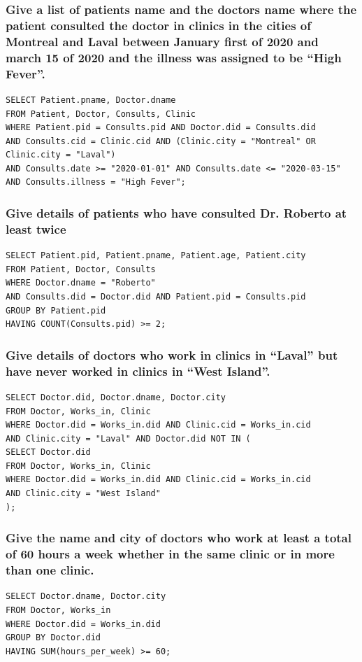 \documentclass[a4paper]{article}
\begin{document}
\subsubsection{Give a list of patients name and the doctors name where the patient consulted the doctor
in clinics in the cities of Montreal and Laval between January first of 2020 and march 15
of 2020 and the illness was assigned to be “High Fever”.}

\begin{verbatim}
SELECT Patient.pname, Doctor.dname
FROM Patient, Doctor, Consults, Clinic
WHERE Patient.pid = Consults.pid AND Doctor.did = Consults.did
AND Consults.cid = Clinic.cid AND (Clinic.city = "Montreal" OR Clinic.city = "Laval") 
AND Consults.date >= "2020-01-01" AND Consults.date <= "2020-03-15"
AND Consults.illness = "High Fever";
\end{verbatim}

\subsubsection{Give details of patients who have consulted Dr. Roberto at least twice}
\begin{verbatim}
SELECT Patient.pid, Patient.pname, Patient.age, Patient.city 
FROM Patient, Doctor, Consults
WHERE Doctor.dname = "Roberto"
AND Consults.did = Doctor.did AND Patient.pid = Consults.pid
GROUP BY Patient.pid
HAVING COUNT(Consults.pid) >= 2;
\end{verbatim}

\subsubsection{Give details of doctors who work in clinics in “Laval” but have never worked in clinics
in “West Island”.}
\begin{verbatim}
SELECT Doctor.did, Doctor.dname, Doctor.city
FROM Doctor, Works_in, Clinic
WHERE Doctor.did = Works_in.did AND Clinic.cid = Works_in.cid 
AND Clinic.city = "Laval" AND Doctor.did NOT IN (
SELECT Doctor.did
FROM Doctor, Works_in, Clinic
WHERE Doctor.did = Works_in.did AND Clinic.cid = Works_in.cid 
AND Clinic.city = "West Island"
);
\end{verbatim}


\subsubsection{Give the name and city of doctors who work at least a total of 60 hours a week whether
in the same clinic or in more than one clinic.}
\begin{verbatim}
SELECT Doctor.dname, Doctor.city 
FROM Doctor, Works_in
WHERE Doctor.did = Works_in.did
GROUP BY Doctor.did
HAVING SUM(hours_per_week) >= 60;
\end{verbatim}
\end{document}
